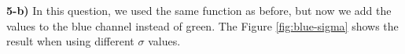 \documentclass[12pt,a4paper]{article}
\begin{document}
\newpage

\textbf{5-b) } In this question, we used the same function as before, but now we add the values to the blue channel instead of  green. The Figure \ref{fig:blue-sigma} shows the result when using different $\sigma$ values. \\

\begin{figure}[!h]%
	\centering
	\quad
	\quad

\end{figure}
\end{document}
